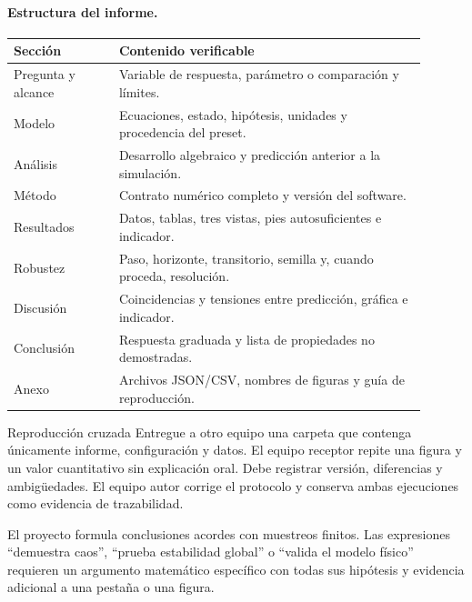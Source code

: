 \paragraph{Estructura del informe.}
\begin{longtable}{>{\raggedright\arraybackslash}p{0.23\linewidth}
                  >{\raggedright\arraybackslash}p{0.67\linewidth}}
\toprule
Sección & Contenido verificable \\
\midrule
\endhead
Pregunta y alcance & Variable de respuesta, parámetro o comparación y límites.\\
Modelo & Ecuaciones, estado, hipótesis, unidades y procedencia del preset.\\
Análisis & Desarrollo algebraico y predicción anterior a la simulación.\\
Método & Contrato numérico completo y versión del software.\\
Resultados & Datos, tablas, tres vistas, pies autosuficientes e indicador.\\
Robustez & Paso, horizonte, transitorio, semilla y, cuando proceda, resolución.\\
Discusión & Coincidencias y tensiones entre predicción, gráfica e indicador.\\
Conclusión & Respuesta graduada y lista de propiedades no demostradas.\\
Anexo & Archivos JSON/CSV, nombres de figuras y guía de reproducción.\\
\bottomrule
\end{longtable}

\begin{activitybox}{Reproducción cruzada}
Entregue a otro equipo una carpeta que contenga únicamente informe, configuración y
datos. El equipo receptor repite una figura y un valor cuantitativo sin explicación
oral. Debe registrar versión, diferencias y ambigüedades. El equipo autor corrige el
protocolo y conserva ambas ejecuciones como evidencia de trazabilidad.
\end{activitybox}

\begin{warningbox}
El proyecto formula conclusiones acordes con muestreos finitos. Las expresiones ``demuestra caos'', ``prueba estabilidad global'' o ``valida el
modelo físico'' requieren un argumento matemático específico con todas sus hipótesis y evidencia adicional a una pestaña o una figura.
\end{warningbox}


